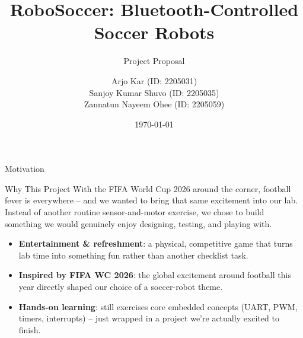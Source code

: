 \documentclass[aspectratio=169]{beamer}
\title{RoboSoccer: Bluetooth-Controlled Soccer Robots}
\subtitle{Project Proposal}
\author{\color{white}
Arjo Kar (ID: 2205031)\\
Sanjoy Kumar Shuvo (ID: 2205035)\\
Zannatun Nayeem Ohee (ID: 2205059)
}
\date{\today}
\begin{document}
\begin{frame}[plain]
\end{frame}

\begin{frame}{Motivation}
  \begin{block}{Why This Project}
    With the FIFA World Cup 2026 around the corner, football fever is everywhere --
    and we wanted to bring that same excitement into our lab. Instead of another
    routine sensor-and-motor exercise, we chose to build something we would
    genuinely enjoy designing, testing, and playing with.
  \end{block}
  \begin{itemize}
    \item \textbf{Entertainment \& refreshment}: a physical, competitive game
          that turns lab time into something fun rather than another checklist task.
    \item \textbf{Inspired by FIFA WC 2026}: the global excitement around football
          this year directly shaped our choice of a soccer-robot theme.
    \item \textbf{Hands-on learning}: still exercises core embedded concepts
          (UART, PWM, timers, interrupts) -- just wrapped in a project we're
          actually excited to finish.
  \end{itemize}
\end{frame}
\end{document}
